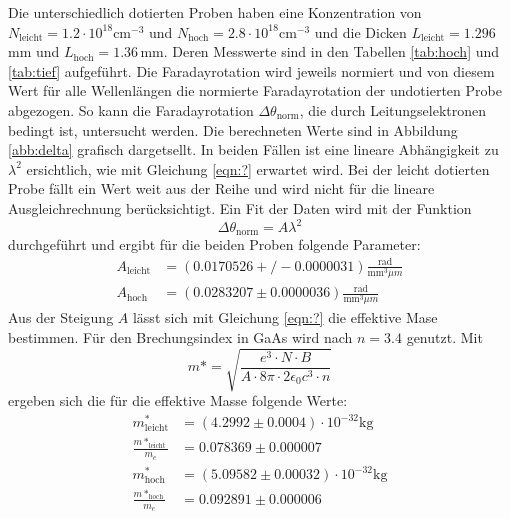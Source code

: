 Die unterschiedlich dotierten Proben haben eine Konzentration von $N_{\text{leicht}}=1.2\cdot10^{18}\text{cm}^{-3}$ und $N_{\text{hoch}}=2.8\cdot10^{18}\text{cm}^{-3}$ und die Dicken $L_{\text{leicht}}=1.296\,$mm und $L_{\text{hoch}}=1.36\,$mm.
Deren Messwerte sind in den Tabellen \ref{tab:hoch} und \ref{tab:tief} aufgeführt.
Die Faradayrotation wird jeweils normiert und von diesem Wert für alle Wellenlängen die normierte Faradayrotation der undotierten Probe abgezogen.
So kann die Faradayrotation $\Delta\theta_\text{norm}$, die durch Leitungselektronen bedingt ist, untersucht werden. 
Die berechneten Werte sind in Abbildung \ref{abb:delta} grafisch dargetsellt.
In beiden Fällen ist eine lineare Abhängigkeit zu $\lambda^2$ ersichtlich, wie mit Gleichung \ref{eqn:?} erwartet wird.
Bei der leicht dotierten Probe fällt ein Wert weit aus der Reihe und wird nicht für die lineare Ausgleichrechnung berücksichtigt.
Ein Fit der Daten wird mit der Funktion
\begin{equation}
  \Delta\theta_{\text{norm}} = A\lambda^2
\end{equation}
durchgeführt und ergibt für die beiden Proben folgende Parameter:
\begin{align*}
  A_{\text{leicht}} &= (0.0170526 +/- 0.0000031) \frac{\text{rad}}{\text{mm}^3\mu m} \\
  A_{\text{hoch}} &= (0.0283207 \pm 0.0000036) \frac{\text{rad}}{\text{mm}^3\mu m}
\end{align*}
Aus der Steigung $A$ lässt sich mit Gleichung \ref{eqn:?} die effektive Mase bestimmen.
Für den Brechungsindex in GaAs wird nach \cite{nGaAs} $n=3.4$ genutzt.
Mit
\begin{equation}
  m*=\sqrt{\frac{e^3\cdot N \cdot B}{A\cdot 8\pi \cdot 2\epsilon_0 c^3 \cdot n }}
\end{equation}
ergeben sich die für die effektive Masse folgende Werte:
\begin{align*}
  m^*_{\text{leicht}} &= (4.2992 \pm 0.0004)\cdot 10^{-32}\text{kg} \\
  \frac{m*_{\text{leicht}}}{m_e} &= 0.078369\pm 0.000007 \\
  m^*_{\text{hoch}} &= (5.09582\pm 0.00032)\cdot 10^{-32}\text{kg} \\
  \frac{m*_{\text{hoch}}}{m_e} &= 0.092891\pm 0.000006\\
\end{align*}

